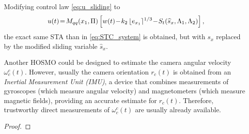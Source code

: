 Modifying control law \eqref{eq:u_sliding} to
%
\begin{equation}
u(t) \!=\! M_{qq}(x_1,\Pi) \left[ w(t) \!-\! k_2 \, \lfloor e_{x_1} \rceil^{1/3} \!-\! S_t(\widehat{s}_x,\Lambda_1,\Lambda_2) \right],
\label{eq:u_sliding_HOSMO}
\end{equation}
%
the exact same STA than in \eqref{eq:STC_system} is obtained, but with $s_x$ replaced by the modified sliding variable $\widehat{s}_x$. 
%

\begin{remark}
Another HOSMO could be designed to estimate the camera angular velocity $\omega_c^c(t)$. However, usually the camera orientation $r_c(t)$ is obtained from an {\it Inertial Measurement Unit (IMU)}, a device that combines measurements of gyroscopes (which measure angular velocity) and magnetometers (which measure magnetic fields), providing an accurate estimate for $r_c(t)$. Therefore, trustworthy direct measurements of $\omega^c_c(t)$ are usually already available.
\end{remark}

\begin{theorem}

\end{theorem}

\begin{proof}

\end{proof}
